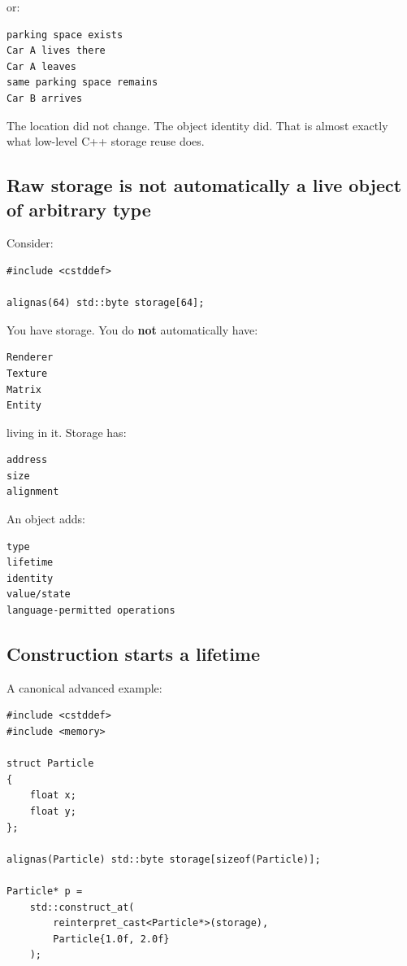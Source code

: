 or:

\begin{verbatim}
parking space exists
Car A lives there
Car A leaves
same parking space remains
Car B arrives
\end{verbatim}

The location did not change. The object identity did. That is almost exactly what low-level C++ storage reuse does.

\subsection{Raw storage is not automatically a live object of arbitrary type}\label{01-foundations-i-ch002-raw-storage-is-not-automatically-a-live-object-of-arbitrary-type}

\hypertarget{01-foundations-i-ch002-raw-storage-is-not-automatically-a-live-object-of-arbitrary-type}{}

Consider:

\begin{verbatim}
#include <cstddef>

alignas(64) std::byte storage[64];
\end{verbatim}

You have storage. You do \textbf{not} automatically have:

\begin{verbatim}
Renderer
Texture
Matrix
Entity
\end{verbatim}

living in it. Storage has:

\begin{verbatim}
address
size
alignment
\end{verbatim}

An object adds:

\begin{verbatim}
type
lifetime
identity
value/state
language-permitted operations
\end{verbatim}

\subsection{Construction starts a lifetime}\label{01-foundations-i-ch002-construction-starts-a-lifetime}

\hypertarget{01-foundations-i-ch002-construction-starts-a-lifetime}{}

A canonical advanced example:

\begin{verbatim}
#include <cstddef>
#include <memory>

struct Particle
{
    float x;
    float y;
};

alignas(Particle) std::byte storage[sizeof(Particle)];

Particle* p =
    std::construct_at(
        reinterpret_cast<Particle*>(storage),
        Particle{1.0f, 2.0f}
    );
\end{verbatim}

